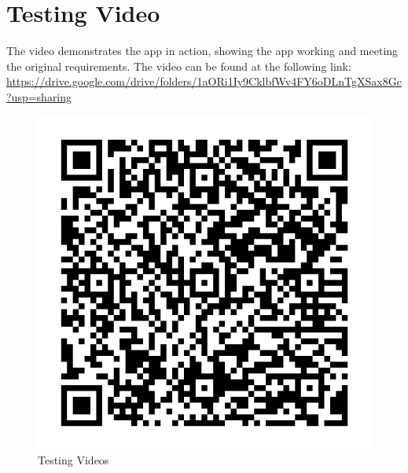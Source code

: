 \section{Testing Video}
The video demonstrates the app in action, showing the app working and meeting the original requirements. The video can be found at the following link: \url{https://drive.google.com/drive/folders/1aORi1Iy9CklbfWv4FY6oDLnTgXSax8Gc?usp=sharing}
\begin{figure}[H]
    \centering
    \includegraphics[width=\textwidth]{Assets/qr_videos.png}
    \caption{Testing Videos}
    \label{fig:testing_video}
\end{figure}


